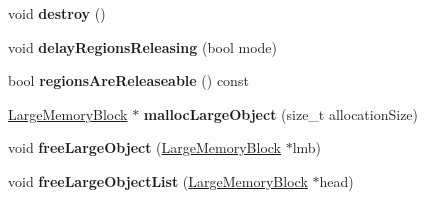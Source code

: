 \begin{DoxyCompactItemize}
\item 
\hypertarget{structrml_1_1internal_1_1ExtMemoryPool_a0c29e1d7182a7e603537c3aba8cb063e}{}void {\bfseries destroy} ()\label{structrml_1_1internal_1_1ExtMemoryPool_a0c29e1d7182a7e603537c3aba8cb063e}

\item 
\hypertarget{structrml_1_1internal_1_1ExtMemoryPool_ae85e5ccabac6221b498dff41ef67ed24}{}void {\bfseries delay\+Regions\+Releasing} (bool mode)\label{structrml_1_1internal_1_1ExtMemoryPool_ae85e5ccabac6221b498dff41ef67ed24}

\item 
\hypertarget{structrml_1_1internal_1_1ExtMemoryPool_af7467f59c2bfa195f1f26799746e53e2}{}bool {\bfseries regions\+Are\+Releaseable} () const \label{structrml_1_1internal_1_1ExtMemoryPool_af7467f59c2bfa195f1f26799746e53e2}

\item 
\hypertarget{structrml_1_1internal_1_1ExtMemoryPool_aa6b81f55e1855f87b46a975685d1fc1f}{}\hyperlink{structrml_1_1internal_1_1LargeMemoryBlock}{Large\+Memory\+Block} $\ast$ {\bfseries malloc\+Large\+Object} (size\+\_\+t allocation\+Size)\label{structrml_1_1internal_1_1ExtMemoryPool_aa6b81f55e1855f87b46a975685d1fc1f}

\item 
\hypertarget{structrml_1_1internal_1_1ExtMemoryPool_a5fd4af27aa9529a0f7fe2ec01a192cce}{}void {\bfseries free\+Large\+Object} (\hyperlink{structrml_1_1internal_1_1LargeMemoryBlock}{Large\+Memory\+Block} $\ast$lmb)\label{structrml_1_1internal_1_1ExtMemoryPool_a5fd4af27aa9529a0f7fe2ec01a192cce}

\item 
\hypertarget{structrml_1_1internal_1_1ExtMemoryPool_a06321d28bde3009b25988ea85bee7748}{}void {\bfseries free\+Large\+Object\+List} (\hyperlink{structrml_1_1internal_1_1LargeMemoryBlock}{Large\+Memory\+Block} $\ast$head)\label{structrml_1_1internal_1_1ExtMemoryPool_a06321d28bde3009b25988ea85bee7748}

\end{DoxyCompactItemize}
